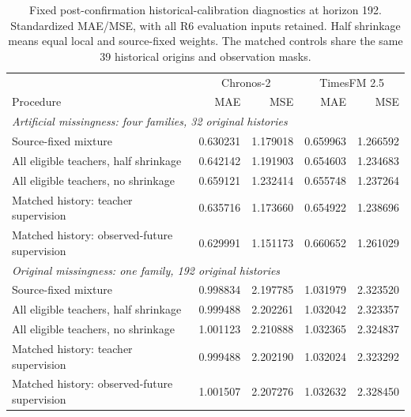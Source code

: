 \begin{table}[!htbp]
\caption{Fixed post-confirmation historical-calibration diagnostics at horizon 192. Standardized MAE/MSE, with all R6 evaluation inputs retained. Half shrinkage means equal local and source-fixed weights. The matched controls share the same 39 historical origins and observation masks.}
\label{tab:r6_prefix_h192}
\centering\small
\begin{tabular}{lrrrr}
\toprule
 & \multicolumn{2}{c}{Chronos-2} & \multicolumn{2}{c}{TimesFM 2.5}\\
Procedure & MAE & MSE & MAE & MSE\\
\midrule
\multicolumn{5}{l}{\textit{Artificial missingness: four families, 32 original histories}}\\
Source-fixed mixture & 0.630231 & 1.179018 & 0.659963 & 1.266592\\
All eligible teachers, half shrinkage & 0.642142 & 1.191903 & 0.654603 & 1.234683\\
All eligible teachers, no shrinkage & 0.659121 & 1.232414 & 0.655748 & 1.237264\\
Matched history: teacher supervision & 0.635716 & 1.173660 & 0.654922 & 1.238696\\
Matched history: observed-future supervision & 0.629991 & 1.151173 & 0.660652 & 1.261029\\
\midrule
\multicolumn{5}{l}{\textit{Original missingness: one family, 192 original histories}}\\
Source-fixed mixture & 0.998834 & 2.197785 & 1.031979 & 2.323520\\
All eligible teachers, half shrinkage & 0.999488 & 2.202261 & 1.032042 & 2.323357\\
All eligible teachers, no shrinkage & 1.001123 & 2.210888 & 1.032365 & 2.324837\\
Matched history: teacher supervision & 0.999488 & 2.202190 & 1.032024 & 2.323292\\
Matched history: observed-future supervision & 1.001507 & 2.207276 & 1.032632 & 2.328450\\
\bottomrule
\end{tabular}
\end{table}

